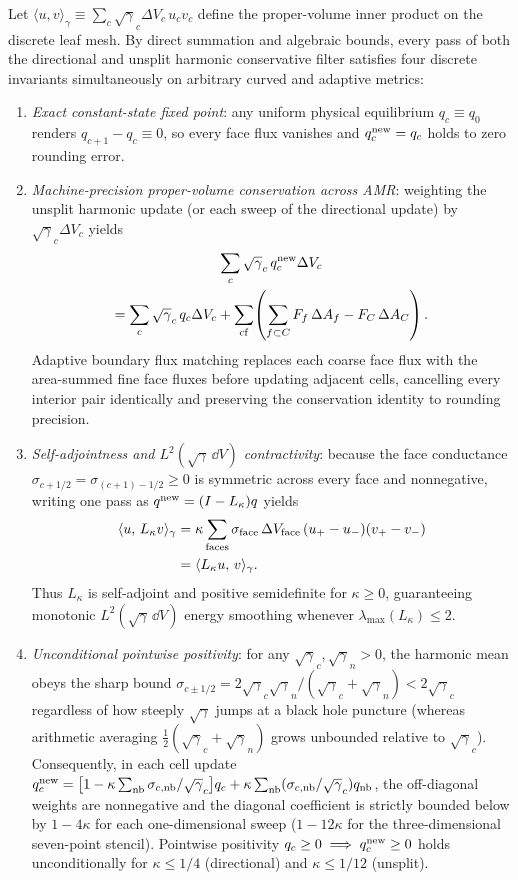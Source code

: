Let $\langle u, v\rangle_\gamma \equiv \sum_c \sqrt{\gamma}_c \Delta V_c\,u_c v_c$ define the proper-volume inner product on the discrete leaf mesh. By direct summation and algebraic bounds, every pass of both the directional and unsplit harmonic conservative filter satisfies four discrete invariants simultaneously on arbitrary curved and adaptive metrics:
\begin{enumerate}
\item \emph{Exact constant-state fixed point}: any uniform physical equilibrium $q_c \equiv q_0$ renders $q_{c+1} - q_c \equiv 0$, so every face flux vanishes and $q_c^{\rm new} = q_c$ holds to zero rounding error.
\item \emph{Machine-precision proper-volume conservation across AMR}: weighting the unsplit harmonic update (or each sweep of the directional update) by $\sqrt{\gamma}_c \Delta V_c$ yields
\begin{multline}\label{eq:mcons_telescoping}
\sum_{c} \sqrt{\gamma}_c\, q_c^{\rm new} \Delta V_c \\
= \sum_{c} \sqrt{\gamma}_c\, q_c \Delta V_c + \sum_{\rm cf}\!\left(\sum_{f \subset C} F_f\,\Delta A_f - F_C\,\Delta A_C\right).
\end{multline}
Adaptive boundary flux matching replaces each coarse face flux with the area-summed fine face fluxes before updating adjacent cells, cancelling every interior pair identically and preserving the conservation identity to rounding precision.
\item \emph{Self-adjointness and $L^2(\sqrt{\gamma}\,\dd V)$ contractivity}: because the face conductance $\sigma_{c+1/2} = \sigma_{(c+1)-1/2} \ge 0$ is symmetric across every face and nonnegative, writing one pass as $q^{\rm new} = (I - L_\kappa) q$ yields
\begin{align}\label{eq:self_adjoint}
\langle u,\, L_\kappa v\rangle_\gamma &= \kappa \sum_{\rm faces} \sigma_{\rm face}\,\Delta V_{\rm face}\,(u_+ - u_-)(v_+ - v_-) \nonumber\\
&= \langle L_\kappa u,\, v\rangle_\gamma.
\end{align}
Thus $L_\kappa$ is self-adjoint and positive semidefinite for $\kappa \ge 0$, guaranteeing monotonic $L^2(\sqrt{\gamma}\,\dd V)$ energy smoothing whenever $\lambda_{\max}(L_\kappa) \le 2$.
\item \emph{Unconditional pointwise positivity}: for any $\sqrt{\gamma}_c, \sqrt{\gamma}_n > 0$, the harmonic mean obeys the sharp bound $\sigma_{c\pm 1/2} = 2\sqrt{\gamma}_c\sqrt{\gamma}_n/(\sqrt{\gamma}_c + \sqrt{\gamma}_n) < 2\sqrt{\gamma}_c$ regardless of how steeply $\sqrt{\gamma}$ jumps at a black hole puncture (whereas arithmetic averaging $\frac{1}{2}(\sqrt{\gamma}_c+\sqrt{\gamma}_n)$ grows unbounded relative to $\sqrt{\gamma}_c$). Consequently, in each cell update $q_c^{\rm new} = \bigl[1 - \kappa\sum_{\rm nb}\sigma_{c,\rm nb}/\sqrt{\gamma}_c\bigr]q_c + \kappa\sum_{\rm nb}(\sigma_{c,\rm nb}/\sqrt{\gamma}_c)q_{\rm nb}$, the off-diagonal weights are nonnegative and the diagonal coefficient is strictly bounded below by $1 - 4\kappa$ for each one-dimensional sweep ($1 - 12\kappa$ for the three-dimensional seven-point stencil). Pointwise positivity $q_c \ge 0 \implies q_c^{\rm new} \ge 0$ holds unconditionally for $\kappa \le 1/4$ (directional) and $\kappa \le 1/12$ (unsplit).

\end{enumerate}
